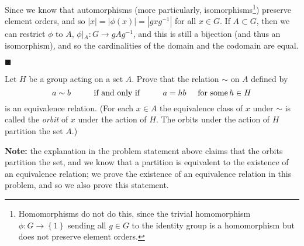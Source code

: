 \documentclass[12pt]{article}
\renewcommand{\qed}{\hfill$\blacksquare$}
\renewenvironment{proof}{\begin{addmargin}[1em]{0em}\begin{newproof}}{\end{newproof}\end{addmargin}\qed}
\newenvironment{problem}[2][Exercise]{\begin{trivlist}
\item[\hskip \labelsep {\bfseries #1}\hskip \labelsep {\bfseries #2.}]}{\end{trivlist}}
\begin{document}
\begin{proof}
Since we know that automorphisms (more particularly, isomorphisms\footnote{Homomorphisms do not do this, since the trivial homomorphism $\phi:G\rightarrow \left\{1\right\}$ sending all $g\in G$ to the identity group is a homomorphism but does not preserve element orders.}) preserve element orders, and so $\left|x\right|=\left|\phi\left(x\right)\right|=\left|gxg^{-1}\right|$ for all $x\in G$. If $A\subset G$, then we can restrict $\phi$ to $A$, $\phi\left|_{A}\right. :G\rightarrow gAg^{-1}$, and this is still a bijection (and thus an isomorphism), and so the cardinalities of the domain and the codomain are equal.
\end{proof}



\begin{problem}{1.7.18}
Let $H$ be a group acting on a set $A$. Prove that the relation $\sim$ on $A$ defined by
$$ a\sim b \hspace{10mm} \text{if and only if} \hspace{10mm} a=hb \hspace{5mm} \text{for some} \, h\in H $$
is an equivalence relation. (For each $x\in A$ the equivalence class of $x$ under $\sim$ is called the \textit{orbit} of $x$ under the action of $H$. The orbits under the action of $H$ partition the set $A$.)
\end{problem}

\textbf{Note:} the explanation in the problem statement above claims that the orbits partition the set, and we know that a partition is equivalent to the existence of an equivalence relation; we prove the existence of an equivalence relation in this problem, and so we also prove this statement.
\end{document}
